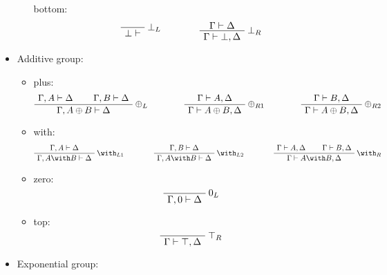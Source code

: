 \begin{itemize}
\begin{itemize}
    bottom: 
    \begin{equation*}
       \LabelRule{ \bot_L }
       \NulRule{ \bot \vdash }
       \DisplayProof
       \qquad\qquad
       \AxRule{ \Gamma \vdash \Delta }
       \LabelRule{ \bot_R }
       \UnaRule{ \Gamma \vdash \bot, \Delta }
       \DisplayProof      
    \end{equation*}
  \end{itemize}
\item
  Additive group:
  \begin{itemize}
  \item
    plus: 
    \begin{equation*}
      \AxRule{ \Gamma, A \vdash \Delta }
      \AxRule{ \Gamma, B \vdash \Delta }
      \LabelRule{ \plus_L }
      \BinRule{ \Gamma, A \plus B \vdash \Delta }
      \DisplayProof
      \qquad\qquad
      \AxRule{ \Gamma \vdash A, \Delta }
      \LabelRule{ \plus_{R1} }
      \UnaRule{ \Gamma \vdash A \plus B, \Delta }
      \DisplayProof
      \qquad\qquad
      \AxRule{ \Gamma \vdash B, \Delta }
      \LabelRule{ \plus_{R2} }
      \UnaRule{ \Gamma \vdash A \plus B, \Delta }
      \DisplayProof
    \end{equation*}
  \item
    with: 
    \begin{equation*}
      \AxRule{ \Gamma, A \vdash \Delta }
      \LabelRule{ \with_{L1} }
      \UnaRule{ \Gamma, A \with B \vdash \Delta }
      \DisplayProof
      \qquad\qquad
      \AxRule{ \Gamma, B \vdash \Delta }
      \LabelRule{ \with_{L2} }
      \UnaRule{ \Gamma, A \with B \vdash \Delta }
      \DisplayProof
      \qquad\qquad
      \AxRule{ \Gamma \vdash A, \Delta }
      \AxRule{ \Gamma \vdash B, \Delta }
      \LabelRule{ \with_R }
      \BinRule{ \Gamma \vdash A \with B, \Delta }
      \DisplayProof      
    \end{equation*}
  \item
    zero: 
    \begin{equation*}
       \LabelRule{ \zero_L }
       \NulRule{ \Gamma, \zero \vdash \Delta }
       \DisplayProof
    \end{equation*}
  \item
    top: 
    \begin{equation*}
       \LabelRule{ \top_R }
       \NulRule{ \Gamma \vdash \top, \Delta }
       \DisplayProof    
    \end{equation*}
  \end{itemize}
\item
  Exponential group:

\end{itemize}

